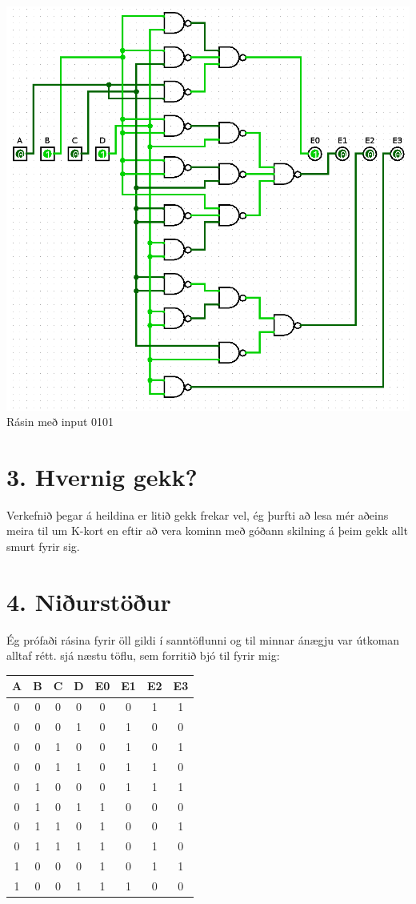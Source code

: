 \documentclass{article}
\begin{document}
\begin{center}
    \includegraphics[scale=0.37]{heil3.png}
    Rásin með input 0101
\end{center}

\section*{3. Hvernig gekk?}
Verkefnið þegar á heildina er litið gekk frekar vel, ég þurfti að lesa mér aðeins meira til um K-kort en eftir að vera kominn með góðann skilning
á þeim gekk allt smurt fyrir sig.

\newpage
\section*{4. Niðurstöður}
Ég prófaði rásina fyrir öll gildi í sanntöflunni og til minnar ánægju var útkoman alltaf rétt.
sjá næstu töflu, sem forritið bjó til fyrir mig:
\begin{center}
    \begin{tabular}{|c|c|c|c|c|c|c|c|}
        \hline
        A&	B&	C&	D&	E0&	E1&	E2&	E3\\
        \hline
        0&	0&	0&	0&	0&	0&	1&	1\\
        \hline
        0&	0&	0&	1&	0&	1&	0&	0\\
        \hline
        0&	0&	1&	0&	0&	1&	0&	1\\
        \hline
        0&	0&	1&	1&	0&	1&	1&	0\\
        \hline
        0&	1&	0&	0&	0&	1&	1&	1\\
        \hline
        0&	1&	0&	1&	1&	0&	0&	0\\
        \hline
        0&	1&	1&	0&	1&	0&	0&	1\\
        \hline
        0&	1&	1&	1&	1&	0&	1&	0\\
        \hline
        1&	0&	0&	0&	1&	0&	1&	1\\
        \hline
        1&	0&	0&	1&	1&	1&	0&	0\\
        \hline
    \end{tabular}
\end{center}
\end{document}
